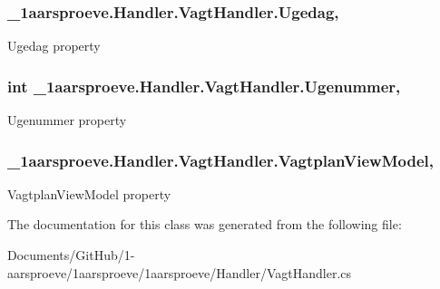 \subsubsection[{Ugedag}]{ \+\_\+1aarsproeve.\+Handler.\+Vagt\+Handler.\+Ugedag\hspace{0.3cm}{\ttfamily [get]}, {\ttfamily [set]}}\label{class__1aarsproeve_1_1_handler_1_1_vagt_handler_a97b98aef44c9aa2dfa598d14a9fc7813}


Ugedag property 

\hypertarget{class__1aarsproeve_1_1_handler_1_1_vagt_handler_a1ba62aedc8333e3b5889d3ffa8132a4c}{}
\subsubsection[{Ugenummer}]{\setlength{\rightskip}{0pt plus 5cm}int \+\_\+1aarsproeve.\+Handler.\+Vagt\+Handler.\+Ugenummer\hspace{0.3cm}{\ttfamily [get]}, {\ttfamily [set]}}\label{class__1aarsproeve_1_1_handler_1_1_vagt_handler_a1ba62aedc8333e3b5889d3ffa8132a4c}


Ugenummer property 

\hypertarget{class__1aarsproeve_1_1_handler_1_1_vagt_handler_ac7a38ad84077edb90a6dc695e05c756e}{}
\subsubsection[{Vagtplan\+View\+Model}]{ \+\_\+1aarsproeve.\+Handler.\+Vagt\+Handler.\+Vagtplan\+View\+Model\hspace{0.3cm}{\ttfamily [get]}, {\ttfamily [set]}}\label{class__1aarsproeve_1_1_handler_1_1_vagt_handler_ac7a38ad84077edb90a6dc695e05c756e}


Vagtplan\+View\+Model property 



The documentation for this class was generated from the following file\+:\begin{DoxyCompactItemize}
\item 
Documents/\+Git\+Hub/1-\/aarsproeve/1aarsproeve/1aarsproeve/\+Handler/Vagt\+Handler.\+cs\end{DoxyCompactItemize}
